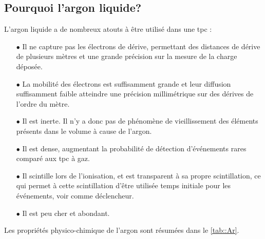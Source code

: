     \subsection{Pourquoi l'argon liquide?}
      L'argon liquide a de nombreux atouts à être utilisé dans une \gls{tpc}\cite{Rubbia1977} :
      \begin{itemize}
        \item[$\bullet$] Il ne capture pas les électrons de dérive, permettant des distances de dérive de plusieurs mètres et une grande précision sur la mesure de la charge déposée.
        \item[$\bullet$] La mobilité des électrons est suffisamment grande et leur diffusion suffisamment faible atteindre une précision millimétrique sur des dérives de l'ordre du mètre.
        \item[$\bullet$] Il est inerte. Il n'y a donc pas de phénomène de vieillissement des éléments présents dans le volume à cause de l'argon.
        \item[$\bullet$] Il est dense, augmentant la probabilité de détection d'événements rares comparé aux \gls{tpc} à gaz.
        \item[$\bullet$] Il scintille lors de l'ionisation, et est transparent à sa propre scintillation, ce qui permet à cette scintillation d'être utilisée temps initiale pour les événements, voir comme déclencheur.
        \item[$\bullet$] Il est peu cher et abondant.
      \end{itemize}
      Les propriétés physico-chimique de l'argon sont résumées dans le \autoref{tab::Ar}.

